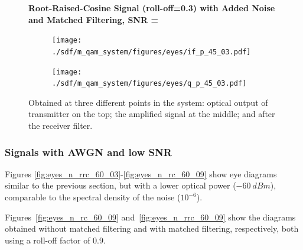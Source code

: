\begin{figure}[H]
		\centering
	\textbf{Root-Raised-Cosine Signal (roll-off=0.3) with Added Noise and Matched Filtering, SNR = }
	\begin{minipage}{\linewidth}
		\centering
	\begin{subfigure}{.45\textwidth}
		\centering
		\texttt{[image: ./sdf/m\_qam\_system/figures/eyes/if\_p\_45\_03.pdf]}
	\end{subfigure}
	\begin{subfigure}{.45\textwidth}
		\centering
		\texttt{[image: ./sdf/m\_qam\_system/figures/eyes/q\_p\_45\_03.pdf]}
	\end{subfigure}
	
	\caption{
		Obtained at three different points in the system: optical output of transmitter on the top;
		the amplified signal at the middle; and
		after the receiver filter.
		\label{fig:eyes_n_rrc_45_03}}
	\end{minipage}
\end{figure}



\subsubsection*{Signals with AWGN and low SNR}
Figures \ref{fig:eyes_n_rrc_60_03}-\ref{fig:eyes_n_rc_60_09} show eye
diagrams similar to the previous section, but with a lower optical power ($-60~dBm$),
comparable to the spectral density of the noise ($10^{-6}$).



Figures~\ref{fig:eyes_n_rc_60_09} and~\ref{fig:eyes_n_rrc_60_09} show the
diagrams obtained without matched filtering and with matched filtering,
respectively, both using a roll-off factor of 0.9.


